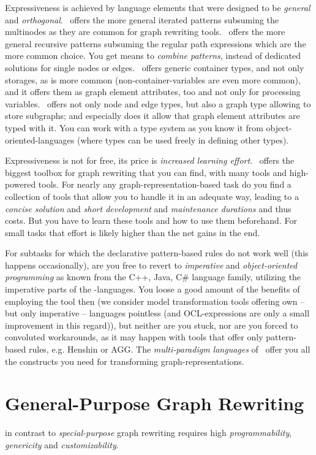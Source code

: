 Expressiveness is achieved by language elements that were designed to be \emph{general} and \emph{orthogonal}.
\GrG\ offers the more general iterated patterns subsuming the multinodes as they are common for graph rewriting tools.
\GrG\ offers the more general recursive patterns subsuming the regular path expressions which are the more common choice.
You get means to \emph{combine patterns}, instead of dedicated solutions for single nodes or edges.
\GrG\ offers generic container types, and not only storages, as is more common (non-container-variables are even more common), and it offers them as graph element attributes, too and not only for processing variables.
\GrG\ offers not only node and edge types, but also a graph type allowing to store subgraphs; and especially does it allow that graph element attributes are typed with it.
You can work with a type system as you know it from object-oriented-languages (where types can be used freely in defining other types).

Expressiveness is not for free, its price is \emph{increased learning effort}.
\GrG\ offers the biggest toolbox for graph rewriting that you can find, with many tools and high-powered tools.
For nearly any graph-representation-based task do you find a collection of tools that allow you to handle it in an adequate way, leading to a \emph{concise solution} and \emph{short development} and \emph{maintenance durations} and thus costs.
But you have to learn these tools and how to use them beforehand.
For small tasks that effort is likely higher than the net gains in the end.

For subtasks for which the declarative pattern-based rules do not work well (this happens occasionally), are you free to revert to \emph{imperative} and \emph{object-oriented programming} as known from the C++, Java, C\# language family, utilizing the imperative parts of the \GrG-languages.
You loose a good amount of the benefits of employing the tool then (we consider model transformation tools offering own -- but only imperative -- languages pointless (and OCL-expressions are only a small improvement in this regard)), but neither are you stuck, nor are you forced to convoluted workarounds, as it may happen with tools that offer only pattern-based rules, e.g. Henshin\cite{Henshin} or AGG\cite{agg}.
The \emph{multi-paradigm languages} of \GrG\ offer you all the constructs you need for transforming graph-representations.

\section{General-Purpose Graph Rewriting}
in contrast to \emph{special-purpose} graph rewriting requires high \emph{programmability}, \emph{genericity} and \emph{customizability}.

